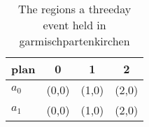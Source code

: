 \documentclass[a4paper]{article}
\begin{document}
\begin{table}
\begin{adjustbox}{width=0.5\columnwidth}
\begin{tabular}{|l|l|l|l|}
\hline
\textbf{plan} & \multicolumn{1}{c|}{\textbf{0}} & \multicolumn{1}{c|}{\textbf{1}} & \multicolumn{1}{c|}{\textbf{2}} \\ \hline
\textbf{$a_0$}  & (0,0) & (1,0) & (2,0) \\ \hline
\textbf{$a_1$}  & (0,0) & (1,0) & (2,0) \\ \hline
\end{tabular}
\end{adjustbox}
\caption{The regions a threeday event held in garmischpartenkirchen 
}
\end{table}
\end{document}
